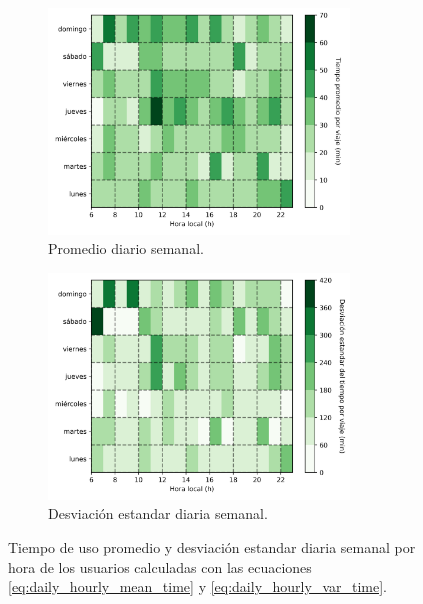 \begin{figure}[H]
    \centering
    \begin{subfigure}[b]{8cm}
        \includegraphics[width=8cm]{Graphics/daily_hourly_mean_time_travel.png}
        \caption{Promedio diario semanal.}
        \label{fig:daily_hourly_mean_time}
    \end{subfigure}
    \begin{subfigure}[b]{8cm}
        \includegraphics[width=8cm]{Graphics/daily_hourly_var_time_travel.png}
        \caption{Desviación estandar diaria semanal.}
        \label{fig:daily_hourly_var_time}
    \end{subfigure}
    \caption{Tiempo de uso promedio y desviación estandar diaria semanal por hora de los usuarios calculadas con las ecuaciones \ref{eq:daily_hourly_mean_time} y \ref{eq:daily_hourly_var_time}.}
    \label{fig:daily_hourly_time}
\end{figure}
